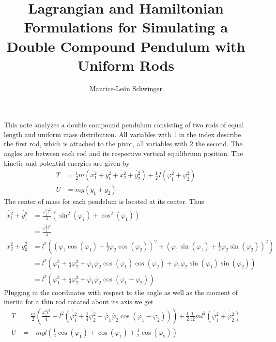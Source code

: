 \documentclass{article}
\author{Maurice-León Schwinger}
\date{}
\title{Lagrangian and Hamiltonian Formulations for Simulating a Double Compound Pendulum with Uniform Rods}
\begin{document}
\maketitle

\noindent This note analyzes a double compound pendulum consisting of two rods of equal length and uniform mass distribution. All variables with 1 in the index describe the first rod, which is attached to the pivot, all variables with 2 the second. The angles are between each rod and its respective vertical equilibrium position. The kinetic and potential energies are given by
\begin{align}
	T &= \frac{1}{2}m\left(\dot{x_1^2}+\dot{y_1^2}+\dot{x_2^2}+\dot{y_2^2}\right)+\frac{1}{2}I\left(\dot{\varphi_1^2}+\dot{\varphi_2^2}\right)\\
	U &= mg\left(y_1+y_2\right)
\end{align}
The center of mass for each pendelum is located at its center. Thus
\begin{align}
	\dot{x_1^2}+\dot{y_1^2}&=\frac{\dot{\varphi_1^2}l^2}{4}\left(\sin^2\left(\varphi_1\right)+\cos^2\left(\varphi_1\right)\right)\\
	&= \frac{\dot{\varphi_1^2}l^2}{4}\\
	\dot{x_2^2}+\dot{y_2^2}&= l^2\left(\left(\dot{\varphi_1}\cos\left(\varphi_1\right)+\frac{1}{2}\dot{\varphi_2}\cos\left(\varphi_2\right)\right)^2+\left(\dot{\varphi_1}\sin\left(\varphi_1\right)+\frac{1}{2}\dot{\varphi_2}\sin\left(\varphi_2\right)\right)^2\right)\\
	&= l^2\left(\dot{\varphi_1^2}+\frac{1}{4}\dot{\varphi_2^2}+\dot{\varphi_1}\dot{\varphi_2}\cos\left(\varphi_1\right)\cos\left(\varphi_2\right)+\dot{\varphi_1}\dot{\varphi_2}\sin\left(\varphi_1\right)\sin\left(\varphi_2\right)\right)\\
	&= l^2\left(\dot{\varphi_1^2}+\frac{1}{4}\dot{\varphi_2^2}+\dot{\varphi_1}\dot{\varphi_2}\cos\left(\varphi_1-\varphi_2\right)\right)
\end{align}
Plugging in the coordinates with respect to the angle as well as the moment of inertia for a thin rod rotated about its axis we get
\begin{align}
	T &= \frac{m}{2}\left(\frac{\dot{\varphi_1^2}l^2}{4}+l^2\left(\dot{\varphi_1^2}+\frac{1}{4}\dot{\varphi_2^2}+\dot{\varphi_1}\dot{\varphi_2}\cos\left(\varphi_1-\varphi_2\right)\right)\right)+\frac{1}{2}\frac{1}{12}ml^2\left(\dot{\varphi_1^2}+\dot{\varphi_2^2}\right)\\
	U &= -mgl\left(\frac{1}{2}\cos\left(\varphi_1\right)+\cos\left(\varphi_1\right)+\frac{1}{2}\cos\left(\varphi_2\right)\right)
\end{align}
\end{document}
